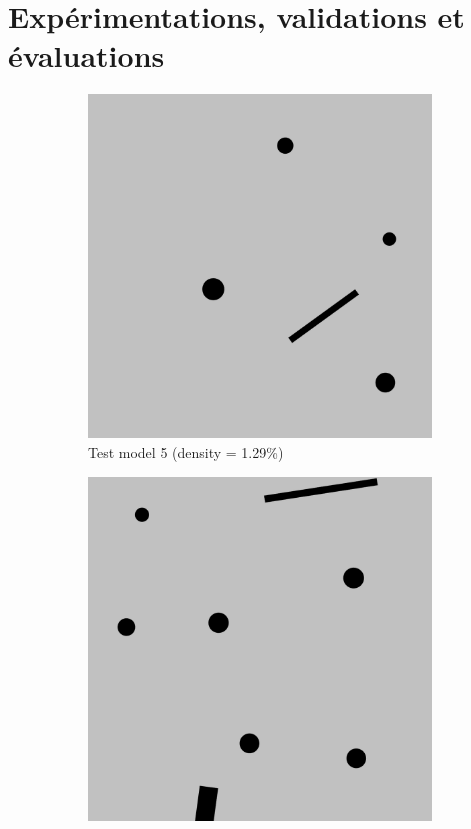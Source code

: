 \documentclass[francais,RandD]{rapportPFE}
\begin{document}
	\section{Expérimentations, validations et évaluations}
		\begin{figure}[h!]
			\begin{subfigure}[t]{0.3\linewidth}
				\includegraphics[width=\linewidth]{graphics/test_model_5.png}
				\caption{Test model 5 (density = 1.29\%)}
				\label{fig:test_model_5}
			\end{subfigure}
			\hfill
			\begin{subfigure}[t]{0.3\linewidth}
					\includegraphics[width=\linewidth]{graphics/test_model_8.png}

\end{subfigure}
\end{figure}
\end{document}
